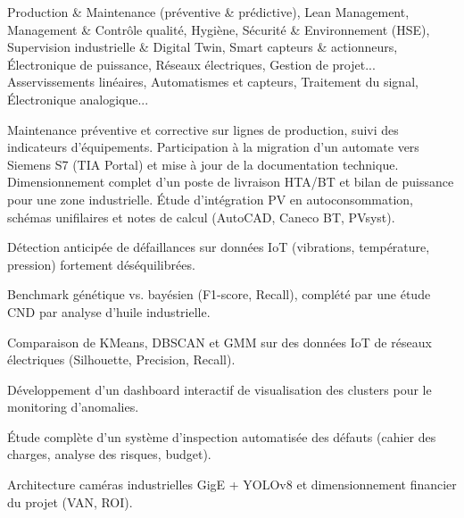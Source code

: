 \documentclass[10pt,a4paper]{../altacv}
\begin{document}
\cvidentite
{}
\makecvheader

\cvformation
{Production \& Maintenance (préventive \& prédictive), Lean Management, Management \& Contrôle qualité, Hygiène, Sécurité \& Environnement (HSE), Supervision industrielle \& Digital Twin, Smart capteurs \& actionneurs, Électronique de puissance, Réseaux électriques, Gestion de projet...}
{Asservissements linéaires, Automatismes et capteurs, Traitement du signal, Électronique analogique...}

\expmenara
{Maintenance préventive et corrective sur lignes de production, suivi des indicateurs d’équipements.}
{Participation à la migration d’un automate vers Siemens S7 (TIA Portal) et mise à jour de la documentation technique.}
\vspace{2pt}
\expcore
{Dimensionnement complet d’un poste de livraison HTA/BT et bilan de puissance pour une zone industrielle.}
{Étude d’intégration PV en autoconsommation, schémas unifilaires et notes de calcul (AutoCAD, Caneco BT, PVsyst).}

\begin{cvitems}
  \item Détection anticipée de défaillances sur données IoT (vibrations, température, pression) fortement déséquilibrées.
  \item Benchmark génétique vs. bayésien (F1-score, Recall), complété par une étude CND par analyse d’huile industrielle.
\end{cvitems}
\vspace{2pt}
\begin{cvitems}
  \item Comparaison de KMeans, DBSCAN et GMM sur des données IoT de réseaux électriques (Silhouette, Precision, Recall).
  \item Développement d’un dashboard interactif de visualisation des clusters pour le monitoring d’anomalies.
\end{cvitems}
\vspace{2pt}
\begin{cvitems}
  \item Étude complète d’un système d’inspection automatisée des défauts (cahier des charges, analyse des risques, budget).
  \item Architecture caméras industrielles GigE + YOLOv8 et dimensionnement financier du projet (VAN, ROI).
\end{cvitems}
\end{document}
